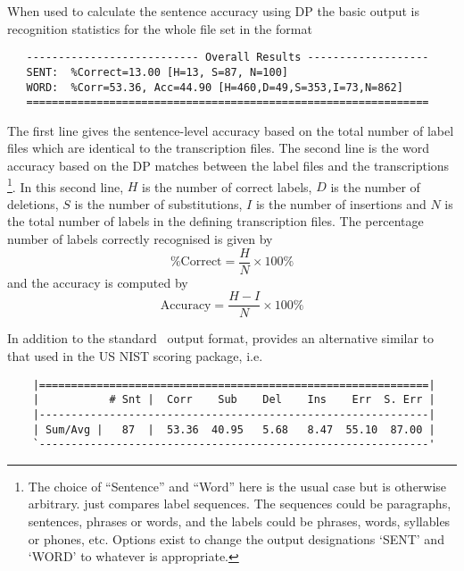 When used to calculate the sentence accuracy using DP the basic 
output is recognition statistics for the whole file set in the format
\begin{verbatim}
   --------------------------- Overall Results -------------------
   SENT:  %Correct=13.00 [H=13, S=87, N=100]
   WORD:  %Corr=53.36, Acc=44.90 [H=460,D=49,S=353,I=73,N=862]
   ===============================================================
\end{verbatim}
The first line gives the sentence-level accuracy based on the 
total number of label files which are identical to the transcription
files.  The second line is the word accuracy based on the DP matches
between the label files and the transcriptions \footnote{
The choice of ``Sentence'' and ``Word'' here is the usual
case but is otherwise arbitrary.
 just compares label sequences.  The sequences
could be paragraphs, sentences, phrases or words, and the labels
could be phrases, words, syllables or phones, etc.  Options exist
to change the output designations `SENT' and `WORD' to whatever
is appropriate.}.
In this second line,
$H$ is the number of correct labels, $D$ is the number of deletions,
$S$ is the number of substitutions, $I$ is the number of insertions and
$N$ is the total number of labels in the defining transcription files.
The percentage number of labels correctly recognised is given by
\begin{equation}
   \mbox{\%Correct} = \frac{H}{N} \times 100\%
\end{equation}
and the accuracy is computed by
\begin{equation}
   \mbox{Accuracy} = \frac{H-I}{N} \times 100\%
\end{equation}

In addition to the standard \HTK\ output format, 
 provides an alternative similar to that used
in the US NIST scoring package, i.e.\
\begin{verbatim}
    |=============================================================|
    |           # Snt |  Corr    Sub    Del    Ins    Err  S. Err |
    |-------------------------------------------------------------|
    | Sum/Avg |   87  |  53.36  40.95   5.68   8.47  55.10  87.00 |
    `-------------------------------------------------------------'

\end{verbatim}


